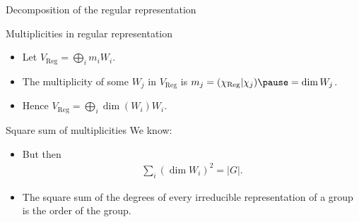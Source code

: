 \documentclass[10pt]{beamer}
\newcommand{\Reg}{\text{Reg}}
\begin{document}
	\begin{frame}{Decomposition of the regular representation}
		\begin{block}{Multiplicities in regular representation}
			\begin{itemize}
				\item Let $ V_\Reg = \bigoplus_i m_i W_i$.\pause
				
				\item The multiplicity of some $W_j$ in $V_\Reg$ is $m_j = (\chi_\Reg|\chi_j) \pause = \dim W_j$.\pause
				
				\item Hence $V_\Reg = \bigoplus_i \dim(W_i)W_i$.
			\end{itemize}
		\end{block}\pause
		\begin{block}{Square sum of multiplicities}
			 We know:
						\begin{itemize}
								\item But then \begin{align*}
										\sum_i (\dim W_i)^2 = |G|.
									\end{align*}
								\item The square sum of the degrees of every irreducible representation of a group is the order of the group.
							\end{itemize}
					\end{block}
		
	\end{frame}
	
\end{document}
